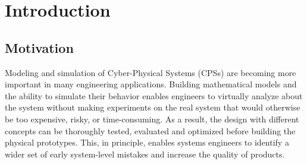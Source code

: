 

\chapter{Introduction}
\label{cha:introduction}


\section{Motivation}
\label{sec:motivation}

Modeling and simulation of Cyber-Physical Systems (CPSs) are becoming more important in many engineering applications. Building mathematical models and the ability to simulate their behavior enables engineers to virtually analyze about the system without making experiments on the real system that would otherwise be too expensive, risky, or time-consuming. As a result, the design with different concepts can be thoroughly tested, evaluated and optimized before building the physical prototypes. This, in principle, enables systems engineers to identify a wider set of early system-level mistakes and increase the quality of products.

